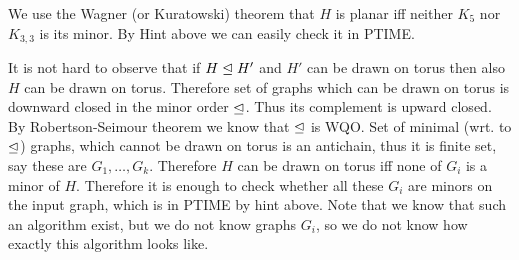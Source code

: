 {
We use the Wagner (or Kuratowski) theorem that $H$ is planar iff neither $K_5$ nor $K_{3,3}$ is its minor.
By Hint above we can easily check it in PTIME.
}

{
It is not hard to observe that if $H \trianglelefteq H'$ and $H'$ can be drawn on torus then also $H$ can be drawn on torus.
Therefore set of graphs which can be drawn on torus is downward closed in the minor order $\trianglelefteq$.
Thus its complement is upward closed. By Robertson-Seimour theorem we know that $\trianglelefteq$ is WQO.
Set of minimal (wrt. to $\trianglelefteq$) graphs, which cannot be drawn on torus is an antichain, thus it is finite set,
say these are $G_1, \ldots, G_k$. Therefore $H$ can be drawn on torus iff none of $G_i$ is a minor of $H$.
Therefore it is enough to check whether all these $G_i$ are minors on the input graph, which is in PTIME
by hint above. Note that we know that such an algorithm exist, but we do not know graphs $G_i$, so we do not
know how exactly this algorithm looks like.
}




